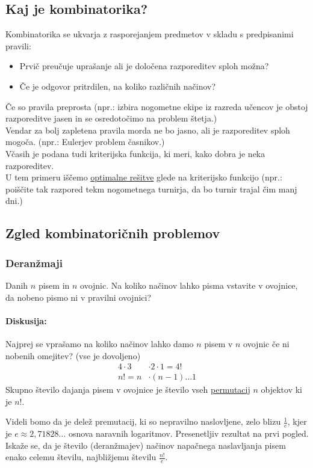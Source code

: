 \subsection{Kaj je kombinatorika?}
Kombinatorika se ukvarja z rasporejanjem predmetov v skladu s predpisanimi pravili:
\begin{itemize}
    \item Prvič preučuje uprašanje ali je določena razporeditev sploh možna?
    \item Če je odgovor pritrdilen, na koliko različnih načinov?
\end{itemize}
Če so pravila preprosta (npr.: izbira nogometne ekipe iz razreda učencov je obstoj razporeditve jasen in se osredotočimo na problem štetja.) \\[1em]
Vendar za bolj zapletena pravila morda ne bo jasno, ali je razporeditev sploh mogoča. (npr.: Eulerjev problem časnikov.) \\[1em]
Včasih je podana tudi kriterijska funkcija, ki meri, kako dobra je neka razporeditev. \\[1em]
U tem primeru iščemo \underline{optimalne rešitve} glede na kriterijsko funkcijo (npr.: poiščite tak razpored tekm nogometnega turnirja, da bo turnir trajal čim manj dni.)

\subsection{Zgled kombinatoričnih problemov}
\subsubsection{Deranžmaji}

Danih $n$ pisem in $n$ ovojnic. Na koliko načinov lahko pisma vstavite v ovojnice, da nobeno pismo ni v pravilni ovojnici?

\paragraph{Diskusija:}
Najprej se vprašamo na koliko načinov lahko damo $n$ pisem v $n$ ovojnic če ni nobenih omejitev? (vse je dovoljeno)
\begin{align*}
    4 \cdot 3 &\cdot 2 \cdot 1 = 4! \\
    n! = n &\cdot (n - 1) \dots 1
\end{align*}
Skupno število dajanja pisem v ovojnice je število vseh \underline{permutacij} $n$ objektov ki je $n!$.


\noindent
Videli bomo da je delež premutacij, ki so nepravilno naslovljene, zelo blizu $\frac{1}{e}$, kjer je $e \approx 2,71828\dots$ osnova naravnih logaritmov. 
Presenetljiv rezultat na prvi pogled. 
Iskaže se, da je število (deranžmajev) načinov napačnega naslavljanja pisem enako celemu številu, najbližjemu številu $\frac{n!}{e}$.

